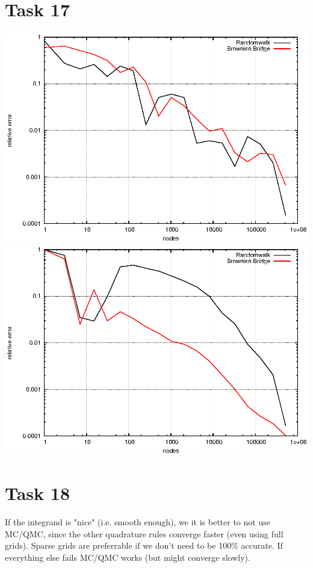 \documentclass[]{article}
\begin{document}
\section*{Task 17}
\includegraphics{task17_mc}\\
\includegraphics{task17_qmc}\\

\section*{Task 18}
If the integrand is "nice" (i.e. smooth enough), we it is better to not use MC/QMC, since the other quadrature rules converge faster (even using full grids). Sparse grids are preferrable if we don't need to be 100\% accurate. If everything else fails MC/QMC works (but might converge slowly).
\end{document}

